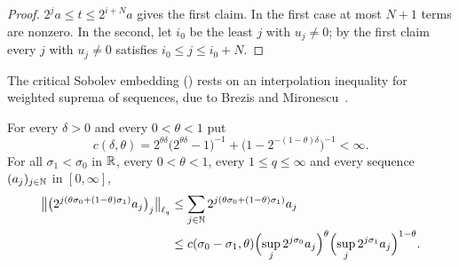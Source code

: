 \begin{proof}
\leanok
$2^j a \leq t \leq 2^{i+N} a$ gives the first claim. In the first case at most $N + 1$ terms are
nonzero. In the second, let $i_0$ be the least $j$ with $u_j \neq 0$; by the first claim every
$j$ with $u_j \neq 0$ satisfies $i_0 \leq j \leq i_0 + N$.
\end{proof}

The critical Sobolev embedding () rests on an
interpolation inequality for weighted suprema of sequences, due to Brezis and
Mironescu~\cite{BrezisMironescu2001}.

\begin{lemma}
\label{lem:dyadic-interpolation}
\leanok
{}
For every $\delta > 0$ and every $0 < \theta < 1$ put
\[
  c(\delta, \theta) = 2^{\theta\delta} \bigl(2^{\theta\delta} - 1\bigr)^{-1}
    + \bigl(1 - 2^{-(1-\theta)\delta}\bigr)^{-1} < \infty .
\]
For all $\sigma_1 < \sigma_0$ in $\mathbb{R}$, every $0 < \theta < 1$, every $1 \leq q \leq \infty$ and
every sequence $(a_j)_{j \in \mathbb{N}}$ in $[0, \infty]$,
\begin{align*}
  \bigl\| \bigl(2^{j(\theta\sigma_0 + (1-\theta)\sigma_1)} a_j\bigr)_j \bigr\|_{\ell_q}
  &\leq \sum_{j \in \mathbb{N}} 2^{j(\theta\sigma_0 + (1-\theta)\sigma_1)} a_j \\
  &\leq c(\sigma_0 - \sigma_1, \theta)
    \Bigl(\sup_{j} 2^{j\sigma_0} a_j\Bigr)^{\theta}
    \Bigl(\sup_{j} 2^{j\sigma_1} a_j\Bigr)^{1-\theta} .
\end{align*}
\end{lemma}

